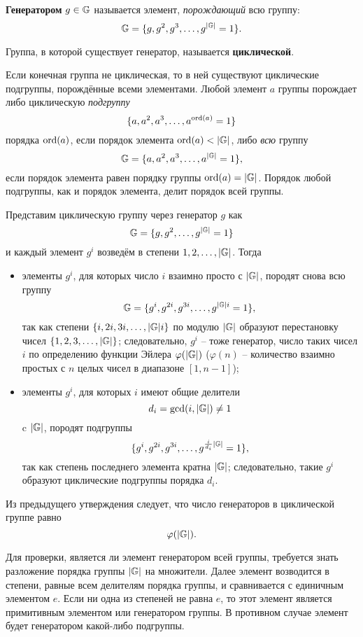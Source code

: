 \textbf{Генератором} $g \in \mathbb{G}$ называется элемент, \emph{порождающий} всю группу:
    \[ \mathbb{G} = \{g, g^2, g^3, \ldots, g^{|\mathbb{G}|} = 1\}. \]

Группа, в которой существует генератор, называется \textbf{циклической}.

Если конечная группа не циклическая, то в ней существуют циклические подгруппы, порождённые всеми элементами. Любой элемент $a$ группы порождает либо циклическую \emph{подгруппу}
    \[ \{ a, a^2, a^3, \dots, a^{\operatorname{ord}(a)} = 1 \} \]
порядка $\operatorname{ord}(a)$, если порядок элемента $\operatorname{ord}(a) < |\mathbb{G}|$, либо \emph{всю} группу
    \[ \mathbb{G} = \{ a, a^2, a^3, \dots, a^{|\mathbb{G}|} = 1 \}, \]
если порядок элемента равен порядку группы $\operatorname{ord}(a) = |\mathbb{G}|$. Порядок любой подгруппы, как и порядок элемента, делит порядок всей группы.

Представим циклическую группу через генератор $g$ как
    \[ \mathbb{G} = \{g, g^2, \ldots, g^{|\mathbb{G}|} = 1\} \]
и каждый элемент $g^i$ возведём в степени $1, 2, \ldots, |\mathbb{G}|$. Тогда
\begin{itemize}
    \item элементы $g^i$, для которых число $i$ взаимно просто с $|\mathbb{G}|$, породят снова всю группу
            \[ \mathbb{G} = \{ g^i, g^{2i}, g^{3i}, \dots, g^{|\mathbb{G}| i} = 1 \}, \]
        так как степени $\{i, 2i, 3i, \dots, |\mathbb{G}| i \}$ по модулю $|\mathbb{G}|$ образуют перестановку чисел $\{1, 2, 3, \dots, |\mathbb{G}|\}$; следовательно, $g^i$ -- тоже генератор, число таких чисел $i$ по определению функции Эйлера $\varphi(|\mathbb{G}|)$ ($\varphi(n)$ -- количество взаимно простых с $n$ целых чисел в диапазоне $[1,n-1]$);
    \item элементы $g^i$, для которых $i$ имеют общие делители
            \[ d_i = \gcd(i, |\mathbb{G}|) \neq 1 \]
        c $|\mathbb{G}|$, породят подгруппы
            \[ \{ g^i, g^{2i}, g^{3i}, \dots, g^{\frac{i}{d_i} |\mathbb{G}|} = 1\}, \]
        так как степень последнего элемента кратна $|\mathbb{G}|$; следовательно, такие $g^i$ образуют циклические подгруппы порядка $d_i$.
\end{itemize}

Из предыдущего утверждения следует, что число генераторов в циклической группе равно
    \[ \varphi(|\mathbb{G}|). \]

Для проверки, является ли элемент генератором всей группы, требуется знать разложение порядка группы $|\mathbb{G}|$ на множители. Далее элемент возводится в степени, равные всем делителям порядка группы, и сравнивается с единичным элементом $e$. Если ни одна из степеней не равна $e$, то этот элемент является примитивным элементом или генератором группы. В противном случае элемент будет генератором какой-либо подгруппы.

